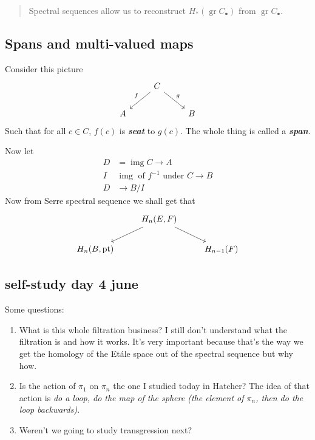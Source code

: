 \documentclass{article}
\DeclareMathOperator{\img}{img}
\DeclareMathOperator{\pt}{pt}
\DeclareMathOperator{\gr}{gr}
\begin{document}
\begin{quotation}
	Spectral sequences allow us to reconstruct $H_*(\gr C_\bullet)$ from $\gr C_\bullet$.
\end{quotation}
\subsection{Spans and multi-valued maps}
Consider this picture
\[\begin{tikzcd}
	&C\arrow[dl,"f",swap]\arrow[dr,"g"]\\
	A&&B
\end{tikzcd}\]
Such that for all $c\in C$, $f(c)$ is \textbf{\textit{seat}} to $g(c)$. The whole thing is called a \textbf{\textit{span}}.

Now let
\begin{align*}
	D&=\img C\to A\\
	I&\img \text{ of }f^{-1}\text{ under }C\to B\\
	D&\to B/I
\end{align*}
Now from Serre spectral sequence we shall get that
\[\begin{tikzcd}
	&H_n(E,F)\arrow[dl]\arrow[dr]\\
	H_n(B,\pt)&&H_{n-1}(F)
\end{tikzcd}\]

\subsection{self-study day 4 june}
Some questions:
\begin{enumerate}
	\item What is this whole filtration business? I still don't understand what the filtration is and how it works. It's very important because that's the way we get the homology of the Etále space out of the spectral sequence but why how.
	\item Is the action of $\pi_1$ on $\pi_n$ the one I studied today in Hatcher? The idea of that action is \textit{do a loop, do the map of the sphere (the element of $\pi_n$, then do the loop backwards)}.
	\item Weren't we going to study transgression next?
\end{enumerate}
\end{document}
